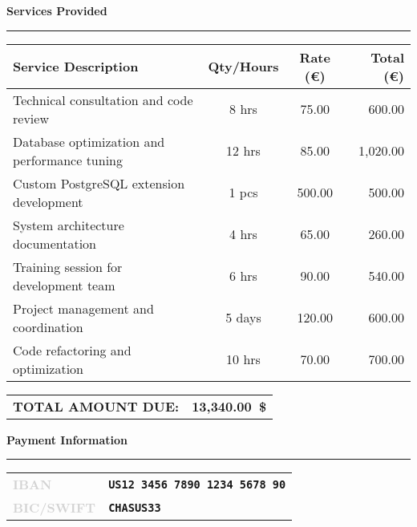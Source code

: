 \documentclass[11pt,a4paper]{article}
\newcommand{\companyiban}{US12 3456 7890 1234 5678 90}
\newcommand{\companybic}{CHASUS33}
\newcommand{\layoutlabel}[1]{\textbf{\textcolor{lightgray}{\footnotesize\MakeUppercase{#1}}}}
\begin{document}
\noindent
{\Large\textbf{\textcolor{primaryblue}{Services Provided}}}
\par\vspace{-0.2cm}
\noindent
\textcolor{primaryblue}{\rule{\textwidth}{0.8pt}}
\vspace{0.3cm}
\begin{tabular}{p{8.6cm} c c r}
    \textbf{\textcolor{primaryblue}{Service Description}} & 
    \textbf{\textcolor{primaryblue}{Qty/Hours}} & 
    \textbf{\textcolor{primaryblue}{Rate (\euro)}} & 
    \textbf{\textcolor{primaryblue}{Total (\euro)}} \\
    \midrule
    Technical consultation and code review & 8 hrs & 75.00 & 600.00 \\
    \rowcolor{lightblue}
    Database optimization and performance tuning & 12 hrs & 85.00 & 1,020.00 \\
    Custom PostgreSQL extension development & 1 pcs & 500.00 & 500.00 \\
    \rowcolor{lightblue}
    System architecture documentation & 4 hrs & 65.00 & 260.00 \\
    Training session for development team & 6 hrs & 90.00 & 540.00 \\
    \rowcolor{lightblue}
    Project management and coordination & 5 days & 120.00 & 600.00 \\
    Code refactoring and optimization & 10 hrs & 70.00 & 700.00 \\
    
    \bottomrule
\end{tabular}

\vspace{0.3cm}

\begin{flushright}
    \begin{tabular}{lr}
        \large\textbf{\textcolor{primaryblue}{TOTAL AMOUNT DUE:}} & 
        {\Large\textbf{\textcolor{primaryblue}{13,340.00\ \$}}} \\
    \end{tabular}
\end{flushright}

\vspace{0.3cm}

\noindent
{\Large\textbf{\textcolor{primaryblue}{Payment Information}}}
\par\vspace{-0.2cm}
\noindent
\textcolor{primaryblue}{\rule{\textwidth}{0.8pt}}
\vspace{0.3cm}
\begin{tabular}{@{}p{3cm}l@{}}
    \layoutlabel{IBAN} & \texttt{\textbf{\companyiban}} \\[0.2cm]
    \layoutlabel{BIC/SWIFT} & \texttt{\textbf{\companybic}} \\[0.2cm]
\end{tabular}
\end{document}
